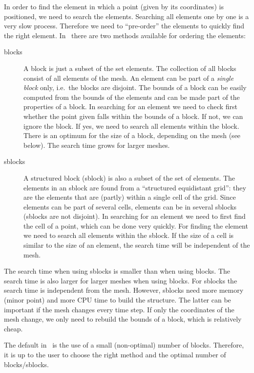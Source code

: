 In order to find the element in which a point (given by its coordinates) is
positioned, we need to search the elements. Searching all elements one by one
is a very slow process. Therefore we need to ``pre-order'' the elements to
quickly find the right element.
In \tfem\ there are two methods available for ordering the elements:
\begin{description}
   \item[blocks] A block is just a subset of the set elements. The collection
      of all blocks consist of all elements of the mesh.
      An element can be part
        of a \emph{single block} only, i.e.\ the blocks are disjoint.
      The bounds of a block can be easily computed from the bounds of the
      elements and can be made part of the properties of a block.
      In searching for an element we need to check first whether the point
      given falls within the bounds of a block. If not, we can ignore the
      block. If yes, we need to search all elements within the block.
      There is an optimum for the size of a block, depending on the mesh (see
      below). The search time grows for larger meshes.
   \item[sblocks] A structured block (sblock) is also a subset of the set of
      elements. The elements in an sblock are found from a ``structured
      equidistant grid'': they are the elements that are (partly) within a
      single cell of the grid. Since elements can be part of several cells,
      elements can be in several sblocks (sblocks are not disjoint).
      In searching for an element we need to first find the cell of a point,
      which can be done very quickly. For finding the element 
      we need to search all elements within the sblock. If the size of a cell 
      is similar to the size of an element, the search time will be independent
      of the mesh.
\end{description}
The search time when using sblocks is smaller than when using blocks. 
The search time
is also larger for larger meshes when using blocks. For sblocks the search time
is independent from the mesh.
However,
sblocks need more memory (minor point) and more CPU time to build the
structure. The latter can be important if the mesh changes every time step.
If only the coordinates of the mesh change, we only need to rebuild the bounds
of a block, which is relatively cheap. 

The default in \tfem\ is the use of a small (non-optimal) number of blocks.
Therefore, it is up to the user to choose the right method and the optimal
number of blocks/sblocks.

